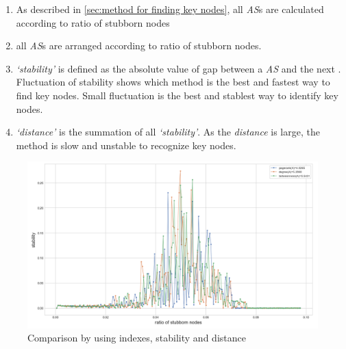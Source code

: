 \begin{enumerate}
	\item As described in \ref{sec:method for finding key nodes}, all \textit{AS}s are calculated according to ratio of stubborn nodes   
	\item all \textit{AS}s are arranged according to ratio of stubborn nodes. 
	\item \textit{`stability'} is defined as the absolute value of gap between a \textit{AS} and the next . Fluctuation of stability shows which method is the best and fastest way to find key nodes. Small fluctuation is the best and stablest way to identify key nodes. 
	\item \textit{`distance'} is the summation of all \textit{`stability'}. As the \textit{distance} is large, the method is slow and unstable to recognize key nodes.
\end{enumerate}
\begin{figure}[!htb]
	\centering
	\includegraphics[width=\hsize]{figure/chap5_keynode_A_2.png}
	\caption{Comparison by using indexes, stability and distance  }
	\label{chap5_keynode_A_2}
\end{figure}

